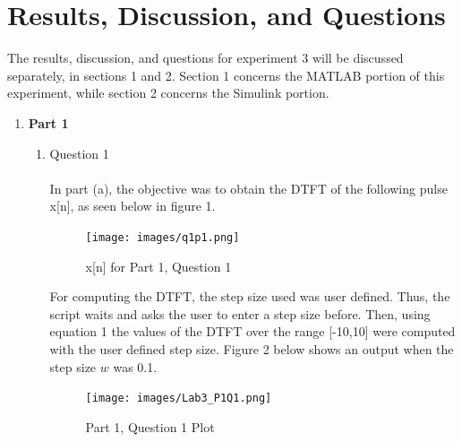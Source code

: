 \documentclass{article}
\begin{document}
\section{Results, Discussion, and Questions}

The results, discussion, and questions for experiment 3 will be discussed separately, in sections 1 and 2. Section 1 concerns the MATLAB portion of this experiment, while section 2 concerns the Simulink portion.

\begin{enumerate}
    \item \textbf{Part 1}
    \begin{enumerate}
        \item Question 1 \\ \\
            In part (a), the objective was to obtain the DTFT of the following pulse x[n], as seen below in figure 1. 
            \begin{figure}[H]
                \begin{center}
                \texttt{[image: images/q1p1.png]}
                    \caption{x[n] for Part 1, Question 1}
                \end{center}
            \end{figure}
            For computing the DTFT, the step size used was user defined. Thus, the script waits and asks the user to enter a step size before. Then, using equation 1 the values of the DTFT over the range [-10,10] were computed with the user defined step size. Figure 2 below shows an output when the step size $w$ was 0.1. 
            \begin{figure}[H]
                \begin{center}
                \texttt{[image: images/Lab3\_P1Q1.png]}
                    \caption{Part 1, Question 1 Plot}
                \end{center}
            \end{figure}
            

\end{enumerate}
\end{enumerate}
\end{document}
